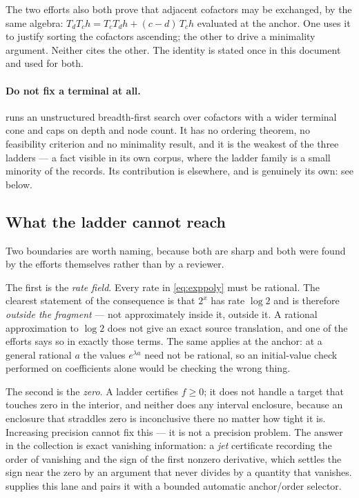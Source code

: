 \begin{remark}
The two efforts also both prove that adjacent cofactors may be exchanged, by
the same algebra: $T_dT_ch=T_cT_dh+(c-d)\,T_ch$ evaluated at the anchor. One
uses it to justify sorting the cofactors ascending; the other to drive a
minimality argument. Neither cites the other. The identity is stated once in
this document and used for both.
\end{remark}

\paragraph{Do not fix a terminal at all.}  runs an unstructured
breadth-first search over cofactors with a wider terminal cone and caps on depth
and node count. It has no ordering theorem, no feasibility criterion and no
minimality result, and it is the weakest of the three ladders --- a fact visible
in its own corpus, where the ladder family is a small minority of the records.
Its contribution is elsewhere, and is genuinely its own: see below.

\subsection{What the ladder cannot reach}

Two boundaries are worth naming, because both are sharp and both were found by
the efforts themselves rather than by a reviewer.

The first is the \emph{rate field}. Every rate in \eqref{eq:exppoly} must be
rational. The clearest statement of the consequence is that $2^x$ has rate
$\log 2$ and is therefore \emph{outside the fragment} --- not approximately
inside it, outside it. A rational approximation to $\log 2$ does not give an
exact source translation, and one of the efforts says so in exactly those
terms. The same applies at the anchor: at a general rational $a$ the values
$e^{\lambda a}$ need not be rational, so an initial-value check performed on
coefficients alone would be checking the wrong thing.

The second is the \emph{zero}. A ladder certifies $f\ge0$; it does not handle a
target that touches zero in the interior, and neither does any interval
enclosure, because an enclosure that straddles zero is inconclusive there no
matter how tight it is. Increasing precision cannot fix this --- it is not a
precision problem. The answer in the collection is exact vanishing information:
a \emph{jet} certificate recording the order of vanishing and the sign of the
first nonzero derivative, which settles the sign near the zero by an argument
that never divides by a quantity that vanishes.  supplies this lane and
pairs it with a bounded automatic anchor/order selector.

